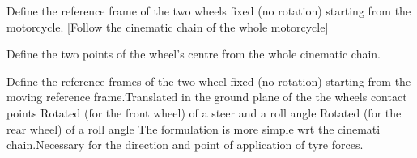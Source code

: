 \documentclass{article}
\begin{document}
\begin{maplegroup}
\begin{Maple Normal}{
Define the reference frame of the two wheels fixed (no rotation) starting from the motorcycle. [Follow the cinematic chain of the whole motorcycle]}\end{Maple Normal}

\end{maplegroup}
\begin{maplegroup}
\begin{mapleinput}
\end{mapleinput}
\end{maplegroup}
\begin{maplegroup}
\begin{mapleinput}
\end{mapleinput}
\end{maplegroup}
\begin{maplegroup}
\begin{Maple Normal}{
Define the two points of the wheel's centre from the whole cinematic chain.}\end{Maple Normal}

\end{maplegroup}
\begin{maplegroup}
\begin{mapleinput}
\end{mapleinput}
\end{maplegroup}
\begin{maplegroup}
\begin{mapleinput}
\end{mapleinput}
\end{maplegroup}
\begin{maplegroup}
\begin{Maple Normal}{
Define the reference frames of the two wheel fixed (no rotation) starting from the moving reference frame.Translated in the ground plane of the the wheels contact points
Rotated (for the front wheel) of a steer and a roll angle
Rotated (for the rear wheel) of a roll angle
The formulation is more simple wrt the cinemati chain.Necessary for the direction and point of application of tyre forces.}\end{Maple Normal}

\end{maplegroup}
\end{document}
